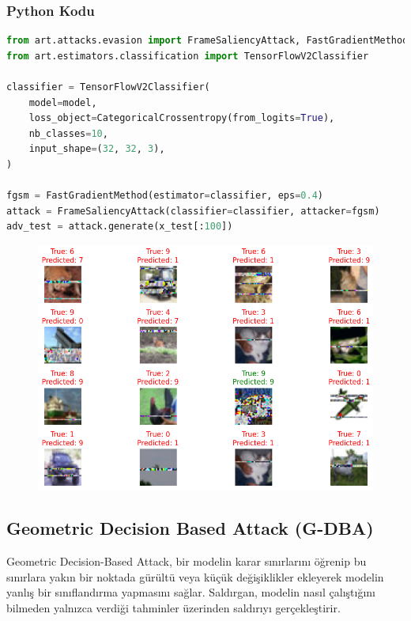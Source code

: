 \subsubsection{Python Kodu}

\begin{lstlisting}[language=Python]
from art.attacks.evasion import FrameSaliencyAttack, FastGradientMethod
from art.estimators.classification import TensorFlowV2Classifier

classifier = TensorFlowV2Classifier(
    model=model,
    loss_object=CategoricalCrossentropy(from_logits=True),
    nb_classes=10,
    input_shape=(32, 32, 3),
)

fgsm = FastGradientMethod(estimator=classifier, eps=0.4)
attack = FrameSaliencyAttack(classifier=classifier, attacker=fgsm)
adv_test = attack.generate(x_test[:100])
\end{lstlisting}

\begin{figure}[h]
    \centering
    \includegraphics[width=1\textwidth]{images/frame_saliency_attack_results.png}
    \caption{}
\end{figure}

\newpage

\subsection{Geometric Decision Based Attack (G-DBA)}

Geometric Decision-Based Attack, bir modelin karar sınırlarını öğrenip bu sınırlara yakın bir noktada gürültü veya küçük değişiklikler ekleyerek modelin yanlış bir sınıflandırma yapmasını sağlar. Saldırgan, modelin nasıl çalıştığını bilmeden yalnızca verdiği tahminler üzerinden saldırıyı gerçekleştirir.

